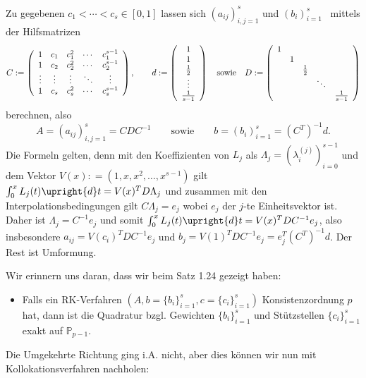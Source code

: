 \documentclass{book}
\newcommand{\assign}{:=}
\newcommand{\tmtextbf}[1]{\text{{\bfseries{#1}}}}
\newenvironment{itemizedot}{\begin{itemize} \renewcommand{\labelitemi}{$\bullet$}\renewcommand{\labelitemii}{$\bullet$}\renewcommand{\labelitemiii}{$\bullet$}\renewcommand{\labelitemiv}{$\bullet$}}{\end{itemize}}
\begin{document}
\begin{remark*}
  \tmtextbf{(Berechnung der Gewichte)}
  
  Zu gegebenen $c_1 < \cdots < c_s \in [0, 1]$ lassen sich $(a_{i j})_{i, j =
  1}^s$ und $(b_i)_{i = 1}^s$ \ mittels der Hilfsmatrizen
  \[ C \assign \left(\begin{array}{ccccc}
       1 & c_1 & c_1^2 & \cdots & c_1^{s - 1}\\
       1 & c_2 & c_2^2 & \cdots & c_2^{s - 1}\\
       \vdots & \vdots & \vdots & \ddots & \vdots\\
       1 & c_s & c_s^2 & \cdots & c_s^{s - 1}
     \end{array}\right), \text{\qquad} d \assign \left(\begin{array}{c}
       1\\
       1\\
       \frac{1}{2}\\
       \vdots\\
       \frac{1}{s - 1}
     \end{array}\right) \text{\quad sowie\quad} D \assign
     \left(\begin{array}{ccccc}
       1 &  &  &  & \\
       & 1 &  &  & \\
       &  & \frac{1}{2} &  & \\
       &  &  & \ddots & \\
       &  &  &  & \frac{1}{s - 1}
     \end{array}\right) \]
  berechnen, also
  \[ A = (a_{i j})_{i, j = 1}^s = C D C^{- 1} \qquad \text{sowie} \qquad b =
     (b_i)_{i = 1}^s = (C^T)^{- 1} d. \]
  {\hspace{1.7em}}Die Formeln gelten, denn mit den Koeffizienten von $L_j$ als
  $\Lambda_j = (\lambda_i^{(j)})_{i = 0}^{s - 1}$ und dem Vektor $V (x) : =
  (1, x, x^2, \ldots, x^{s - 1})$ gilt $\int_0^x L_j (t) \upright{d} t = V
  (x)^T D \Lambda_j$ und zusammen mit den Interpolationsbedingungen gilt $C
  \Lambda_j = e_j$ wobei $e_j$ der $j$-te Einheitsvektor ist. Daher ist
  $\Lambda_j = C^{- 1} e_j$ und somit $\int_0^x L_j (t) \upright{d} t = V
  (x)^T D C^{- 1} e_j$, also insbesondere $a_{i j} = V (c_i)^T D C^{- 1} e_j$
  und $b_j = V (1)^T D C^{- 1} e_j = e_j^T (C^T)^{- 1} d$. Der Rest ist
  Umformung.
\end{remark*}

Wir erinnern uns daran, dass wir beim Satz 1.24 gezeigt haben:
\begin{itemizedot}
  \item Falls ein RK-Verfahren $(A, b = \{ b_i \}_{i = 1}^s, c = \{ c_i \}_{i
  = 1}^s)$ Konsistenzordnung $p$ hat, dann ist die Quadratur bzgl. Gewichten
  $\{ b_i \}_{i = 1}^s$ und St{\"u}tzstellen $\{ c_i \}_{i = 1}^s$ exakt auf
  $\mathbb{P}_{p - 1}$.
\end{itemizedot}
{\hspace{1.7em}}Die Umgekehrte Richtung ging i.A. nicht, aber dies k{\"o}nnen
wir nun mit Kollokationsverfahren nachholen:
\end{document}
